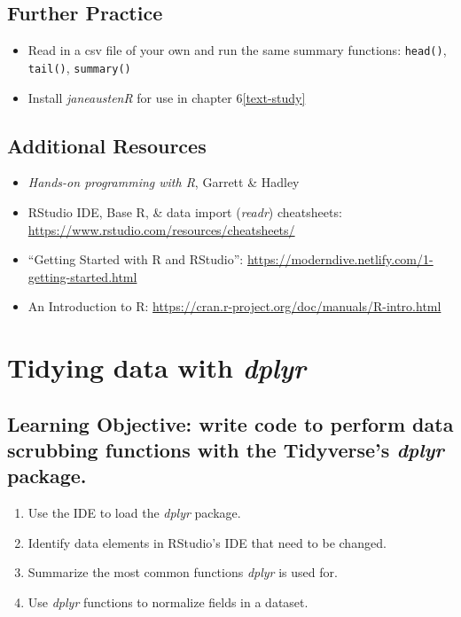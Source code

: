 \documentclass[
  krantz2]{krantz}
\providecommand{\tightlist}{%
  \setlength{\itemsep}{0pt}\setlength{\parskip}{0pt}}
\begin{document}
\hypertarget{rstudio-study}{%
\section{Further Practice}\label{rstudio-study}}

\begin{itemize}
\tightlist
\item
  Read in a csv file of your own and run the same summary functions: \texttt{head()}, \texttt{tail()}, \texttt{summary()}
\item
  Install \emph{janeaustenR} for use in chapter 6\ref{text-study}
\end{itemize}

\hypertarget{rstudio-resources}{%
\section{Additional Resources}\label{rstudio-resources}}

\begin{itemize}
\tightlist
\item
  \emph{Hands-on programming with R}, Garrett \& Hadley
\item
  RStudio IDE, Base R, \& data import (\emph{readr}) cheatsheets: \url{https://www.rstudio.com/resources/cheatsheets/}
\item
  ``Getting Started with R and RStudio'': \url{https://moderndive.netlify.com/1-getting-started.html}
\item
  An Introduction to R: \url{https://cran.r-project.org/doc/manuals/R-intro.html}
\end{itemize}

\hypertarget{dplyr}{%
\chapter{\texorpdfstring{Tidying data with \emph{dplyr}}{Tidying data with dplyr}}\label{dplyr}}

\hypertarget{dplyr-los}{%
\section{\texorpdfstring{Learning Objective: write code to perform data scrubbing functions with the Tidyverse's \emph{dplyr} package.}{Learning Objective: write code to perform data scrubbing functions with the Tidyverse's dplyr package.}}\label{dplyr-los}}

\begin{enumerate}
\def\labelenumi{\arabic{enumi}.}
\tightlist
\item
  Use the IDE to load the \emph{dplyr} package.
\item
  Identify data elements in RStudio's IDE that need to be changed.
\item
  Summarize the most common functions \emph{dplyr} is used for.
\item
  Use \emph{dplyr} functions to normalize fields in a dataset.
\end{enumerate}
\end{document}
